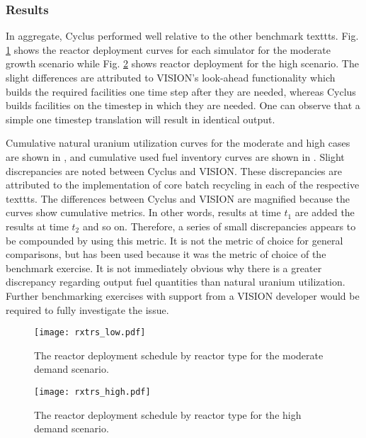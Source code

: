 \subsubsection{Results}


In aggregate, Cyclus performed well relative to the other benchmark
texttts. Fig. \ref{fig:rxtrs_low} shows the reactor deployment curves for each
simulator for the moderate growth scenario while Fig. \ref{fig:rxtrs_high} shows
reactor deployment for the high scenario. The slight differences are attributed
to VISION's look-ahead functionality which builds the required facilities one
time step after they are needed, whereas Cyclus builds facilities on the
timestep in which they are needed. One can observe that a simple one timestep
translation will result in identical output.

Cumulative natural uranium utilization curves for the moderate and high cases
are shown in , and cumulative used fuel
inventory curves are shown in
. Slight discrepancies are noted
between Cyclus and VISION. These discrepancies are attributed to the
implementation of core batch recycling in each of the respective texttts. The
differences between Cyclus and VISION are magnified because the curves show
cumulative metrics. In other words, results at time $t_1$ are added the results
at time $t_2$ and so on. Therefore, a series of small discrepancies appears to
be compounded by using this metric. It is not the metric of choice for general
comparisons, but has been used because it was the metric of choice of the
benchmark exercise. It is not immediately obvious why there is a greater
discrepancy regarding output fuel quantities than natural uranium
utilization. Further benchmarking exercises with support from a VISION developer
would be required to fully investigate the issue.

\begin{figure}
  \begin{center}
    \texttt{[image: rxtrs\_low.pdf]}
    \caption{The reactor deployment schedule by reactor type for the moderate demand scenario.}
    \label{fig:rxtrs_low}
  \end{center}  
\end{figure}

\begin{figure}
  \begin{center}
    \texttt{[image: rxtrs\_high.pdf]}
    \caption{The reactor deployment schedule by reactor type for the high demand scenario.}
    \label{fig:rxtrs_high}
  \end{center}  
\end{figure}

